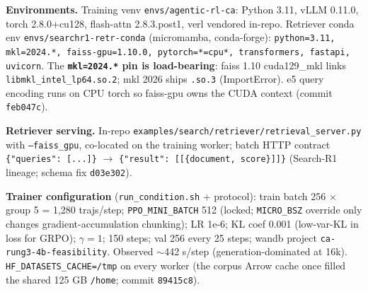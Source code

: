 \documentclass[10pt]{article}
\newcommand{\cmd}[1]{\texttt{\small #1}}
\begin{document}
\textbf{Environments.} Training venv \cmd{envs/agentic-rl-ca}: Python 3.11, vLLM 0.11.0,
torch 2.8.0+cu128, flash-attn 2.8.3.post1, verl vendored in-repo. Retriever conda env
\cmd{envs/searchr1-retr-conda} (micromamba, conda-forge): \cmd{python=3.11, mkl=2024.*,
faiss-gpu=1.10.0, pytorch=*=cpu*, transformers, fastapi, uvicorn}. The \textbf{\cmd{mkl=2024.*} pin is
load-bearing}: faiss 1.10 cuda129\_mkl links \cmd{libmkl\_intel\_lp64.so.2}; mkl 2026 ships \cmd{.so.3}
(ImportError). e5 query encoding runs on CPU torch so faiss-gpu owns the CUDA context (commit
\cmd{feb047c}).

\textbf{Retriever serving.} In-repo \cmd{examples/search/retriever/retrieval\_server.py} with
\cmd{--faiss\_gpu}, co-located on the training worker; batch HTTP contract
\cmd{\{"queries": [...]\}} $\to$ \cmd{\{"result": [[\{document, score\}]]\}} (Search-R1 lineage;
schema fix \cmd{d03e302}).

\textbf{Trainer configuration} (\cmd{run\_condition.sh} + protocol): train batch 256 $\times$
group 5 = 1{,}280 trajs/step; \cmd{PPO\_MINI\_BATCH} 512 (locked; \cmd{MICRO\_BSZ} override only
changes gradient-accumulation chunking); LR 1e-6; KL coef 0.001 (low-var-KL in loss for GRPO);
$\gamma{=}1$; 150 steps; val 256 every 25 steps; wandb project
\cmd{ca-rung3-4b-feasibility}. Observed $\sim$442 s/step (generation-dominated at 16k).
\cmd{HF\_DATASETS\_CACHE=/tmp} on every worker (the corpus Arrow cache once filled the shared 125 GB
\cmd{/home}; commit \cmd{89415c8}).
\end{document}
